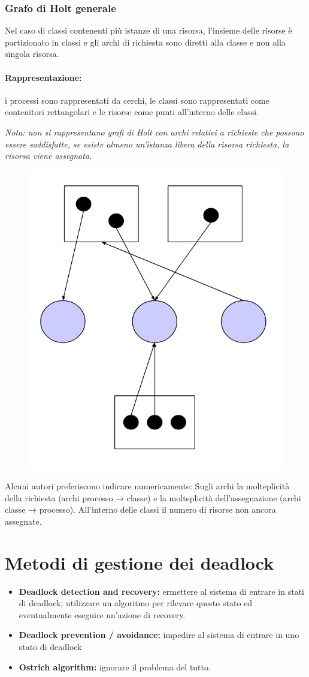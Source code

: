 \subsubsection{Grafo di Holt generale}
Nel caso di classi contenenti più istanze di una risorsa, l'insieme delle risorse è partizionato in classi e gli archi di richiesta sono diretti alla classe e non alla singola risorsa.

\paragraph{Rappresentazione:} i processi sono rappresentati da cerchi, le classi sono rappresentati come contenitori rettangolari
e le risorse come punti all'interno delle classi.

\textit{Nota: non si rappresentano grafi di Holt con archi relativi a richieste che possono essere soddisfatte, se esiste almeno un'istanza libera della risorsa richiesta, la risorsa viene
assegnata.}

\begin{figure} [h]
    \centering
    \includegraphics[width=0.2\linewidth]{Images/Screenshot 2024-12-30 at 18-04-17 so-04-risorse - so-04-risorse.pdf.png}
\end{figure}

Alcuni autori preferiscono indicare numericamente:
Sugli archi la molteplicità della richiesta
(archi processo → classe) e la molteplicità dell'assegnazione
(archi classe → processo).
All'interno delle classi il numero di risorse non ancora
assegnate.


\section{Metodi di gestione dei deadlock}

\begin{itemize}
    \item \textbf{Deadlock detection and recovery:} ermettere al sistema di entrare in stati di deadlock; utilizzare un algoritmo per rilevare questo stato ed eventualmente eseguire un'azione di recovery.
    \item \textbf{Deadlock prevention / avoidance:} impedire al sistema di entrare in uno stato di deadlock
    \item \textbf{Ostrich algorithm:} ignorare il problema del tutto.
\end{itemize}

